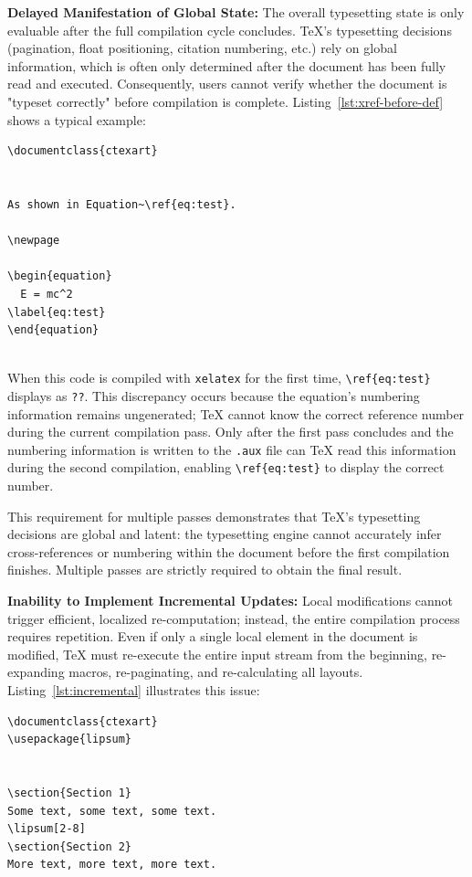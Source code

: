 \textbf{Delayed Manifestation of Global State:} The overall typesetting state is only evaluable after the full compilation cycle concludes. \TeX{}'s typesetting decisions (pagination, float positioning, citation numbering, etc.) rely on global information, which is often only determined after the document has been fully read and executed. Consequently, users cannot verify whether the document is "typeset correctly" before compilation is complete. Listing~\ref{lst:xref-before-def} shows a typical example:

\begin{lstlisting}[caption={Cross-reference before definition},label={lst:xref-before-def}]
\documentclass{ctexart}


As shown in Equation~\ref{eq:test}.

\newpage

\begin{equation}
  E = mc^2
\label{eq:test}
\end{equation}


\end{lstlisting}

When this code is compiled with \texttt{xelatex} for the first time, \texttt{\textbackslash ref\{eq:test\}} displays as \texttt{??}. This discrepancy occurs because the equation's numbering information remains ungenerated; \TeX{} cannot know the correct reference number during the current compilation pass. Only after the first pass concludes and the numbering information is written to the \texttt{.aux} file can \TeX{} read this information during the second compilation, enabling \texttt{\textbackslash ref\{eq:test\}} to display the correct number.

This requirement for multiple passes demonstrates that \TeX{}'s typesetting decisions are global and latent: the typesetting engine cannot accurately infer cross-references or numbering within the document before the first compilation finishes. Multiple passes are strictly required to obtain the final result.

\textbf{Inability to Implement Incremental Updates:} Local modifications cannot trigger efficient, localized re-computation; instead, the entire compilation process requires repetition. Even if only a single local element in the document is modified, \TeX{} must re-execute the entire input stream from the beginning, re-expanding macros, re-paginating, and re-calculating all layouts. Listing~\ref{lst:incremental} illustrates this issue:

\begin{lstlisting}[caption={Incremental update example},label={lst:incremental}]
\documentclass{ctexart}
\usepackage{lipsum}


\section{Section 1}
Some text, some text, some text.
\lipsum[2-8]
\section{Section 2}
More text, more text, more text.


\end{lstlisting}

